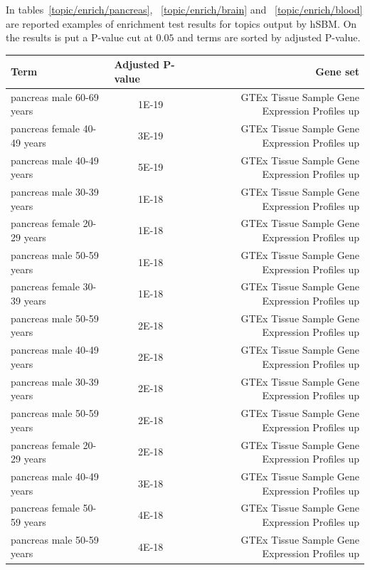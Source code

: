 In tables~\ref{topic/enrich/pancreas}, ~\ref{topic/enrich/brain} and ~\ref{topic/enrich/blood} are reported examples of enrichment test results for topics output by hSBM. On the results is put a P-value cut at $0.05$ and terms are sorted by adjusted P-value.
\begin{table}[htb!]
	\tiny
	\begin{center}
		\begin{tabular}{|l|c|r|}
			\hline
			Term & \multicolumn{1}{l|}{Adjusted P-value} & Gene set \\ \hline
			pancreas male 60-69 years & 1E-19 & GTEx Tissue Sample Gene Expression Profiles up \\ \hline
			pancreas female 40-49 years & 3E-19 & GTEx Tissue Sample Gene Expression Profiles up \\ \hline
			pancreas male 40-49 years & 5E-19 & GTEx Tissue Sample Gene Expression Profiles up \\ \hline
			pancreas male 30-39 years & 1E-18 & GTEx Tissue Sample Gene Expression Profiles up \\ \hline
			pancreas female 20-29 years & 1E-18 & GTEx Tissue Sample Gene Expression Profiles up \\ \hline
			pancreas male 50-59 years & 1E-18 & GTEx Tissue Sample Gene Expression Profiles up \\ \hline
			pancreas female 30-39 years & 1E-18 & GTEx Tissue Sample Gene Expression Profiles up \\ \hline
			pancreas male 50-59 years & 2E-18 & GTEx Tissue Sample Gene Expression Profiles up \\ \hline
			pancreas male 40-49 years & 2E-18 & GTEx Tissue Sample Gene Expression Profiles up \\ \hline
			pancreas male 30-39 years & 2E-18 & GTEx Tissue Sample Gene Expression Profiles up \\ \hline
			pancreas male 50-59 years & 2E-18 & GTEx Tissue Sample Gene Expression Profiles up \\ \hline
			pancreas female 20-29 years & 2E-18 & GTEx Tissue Sample Gene Expression Profiles up \\ \hline
			pancreas male 40-49 years & 3E-18 & GTEx Tissue Sample Gene Expression Profiles up \\ \hline
			pancreas female 50-59 years & 4E-18 & GTEx Tissue Sample Gene Expression Profiles up \\ \hline
			pancreas male 50-59 years & 4E-18 & GTEx Tissue Sample Gene Expression Profiles up \\ \hline

\end{tabular}
\end{center}
\end{table}
